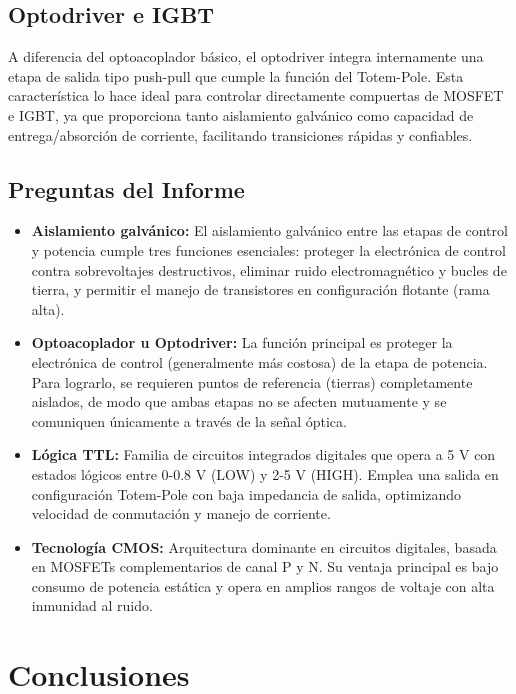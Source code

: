 \documentclass[12pt]{article}
\begin{document}
\subsection{Optodriver e IGBT}

A diferencia del optoacoplador básico, el optodriver integra internamente una etapa de salida tipo push-pull que cumple la función del Totem-Pole. Esta característica lo hace ideal para controlar directamente compuertas de MOSFET e IGBT, ya que proporciona tanto aislamiento galvánico como capacidad de entrega/absorción de corriente, facilitando transiciones rápidas y confiables.

\subsection{Preguntas del Informe}

\begin{itemize}
    \item \textbf{Aislamiento galvánico:} El aislamiento galvánico entre las etapas de control y potencia cumple tres funciones esenciales: proteger la electrónica de control contra sobrevoltajes destructivos, eliminar ruido electromagnético y bucles de tierra, y permitir el manejo de transistores en configuración flotante (rama alta).
    
    \item \textbf{Optoacoplador u Optodriver:} La función principal es proteger la electrónica de control (generalmente más costosa) de la etapa de potencia. Para lograrlo, se requieren puntos de referencia (tierras) completamente aislados, de modo que ambas etapas no se afecten mutuamente y se comuniquen únicamente a través de la señal óptica.
    
    \item \textbf{Lógica TTL:} Familia de circuitos integrados digitales que opera a 5 V con estados lógicos entre 0-0.8 V (LOW) y 2-5 V (HIGH). Emplea una salida en configuración Totem-Pole con baja impedancia de salida, optimizando velocidad de conmutación y manejo de corriente.
    
    \item \textbf{Tecnología CMOS:} Arquitectura dominante en circuitos digitales, basada en MOSFETs complementarios de canal P y N. Su ventaja principal es bajo consumo de potencia estática y opera en amplios rangos de voltaje con alta inmunidad al ruido.
\end{itemize}

\section{Conclusiones}
\end{document}
